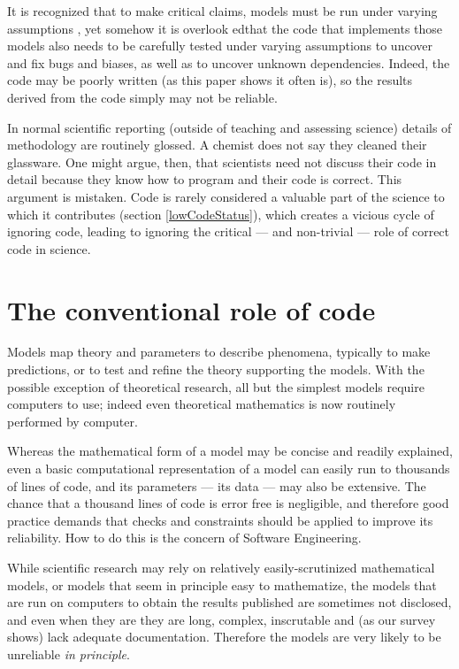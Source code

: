 \documentclass{comjnl}
\begin{document}
It is recognized that to make critical claims, models must be run under varying assumptions \cite{whitty}, yet somehow it is overlook edthat the code that implements those models also needs to be carefully tested under varying assumptions to uncover and fix bugs and biases, as well as to uncover unknown dependencies. Indeed, the code may be poorly written (as this paper shows it often is), so the results derived from the code simply may not be reliable. 

\label{section-vicious-cycles}
In normal scientific reporting (outside of teaching and assessing science) details of methodology are routinely glossed. A chemist does not say they cleaned their glassware. One might argue, then, that scientists need not discuss their code in detail because they know how to program and their code is correct. This argument is mistaken. Code is rarely considered a valuable part of the science to which it contributes (section \ref{lowCodeStatus}), which creates a vicious cycle of ignoring code, leading to ignoring the critical --- and non-trivial --- role of correct code in science. 



\section{The conventional role of code}

Models map theory and parameters to describe phenomena, typically to make predictions, or to test and refine the theory supporting the models. With the possible exception of theoretical research, all but the simplest models require computers to use; indeed even theoretical mathematics is now routinely performed by computer.

Whereas the mathematical form of a model may be concise and readily explained, even a basic computational representation of a model can easily run to thousands of lines of code, and its parameters --- its data --- may also be extensive. The chance that a thousand lines of code is error free is negligible, and therefore good practice demands that checks and constraints should be applied to improve its reliability. How to do this is the concern of Software Engineering. 

While scientific research may rely on relatively easily-scrutinized mathematical models, or models that seem in principle easy to mathematize, the models that are run on computers to obtain the results published are sometimes not disclosed, and even when they are they are long, complex, inscrutable and (as our survey shows) lack adequate documentation. Therefore the models are very likely to be unreliable \emph{in principle}. 
\end{document}

